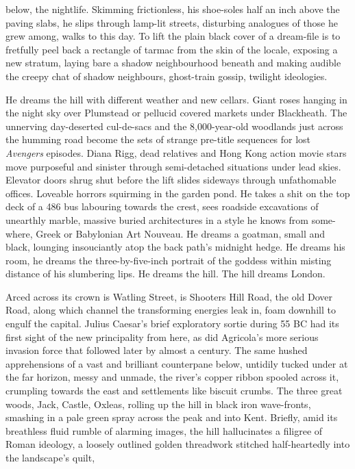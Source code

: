 \documentclass[
]{article}
\begin{document}
below, the nightlife. Skimming frictionless, his shoe-soles half an inch
above the paving slabs, he slips through lamp-lit streets, disturbing
analogues of those he grew among, walks to this day. To lift the plain
black cover of a dream-file is to fretfully peel back a rectangle of
tarmac from the skin of the locale, exposing a new stratum, laying bare
a shadow neighbourhood beneath and making audible the creepy chat of
shadow neighbours, ghost-train gossip, twilight ideologies. \par
He dreams the hill with different weather and new cellars. Giant
roses hanging in the night sky over Plumstead or pellucid covered
markets under Blackheath. The unnerving day-deserted cul-de-sacs and the
8,000-year-old woodlands just across the humming road become the sets of
strange pre-title sequences for lost \emph{Avengers} episodes. Diana
Rigg, dead relatives and Hong Kong action movie stars move purposeful
and sinister through semi-detached situations under lead skies. Elevator
doors shrug shut before the lift slides sideways through unfathomable
offices. Loveable horrors squirming in the garden pond. He takes a shit
on the top deck of a 486 bus labouring towards the crest, sees roadside
excavations of unearthly marble, massive buried architectures in a style
he knows from some-where, Greek or Babylonian Art Nouveau. He dreams a
goatman, small and black, lounging insouciantly atop the back path's
midnight hedge. He dreams his room, he dreams the three-by-five-inch
portrait of the goddess within misting distance of his slumbering lips.
He dreams the hill. The hill dreams London. \par
Arced across its crown is Watling Street, is Shooters Hill Road,
the old Dover Road, along which channel the transforming energies leak
in, foam downhill to engulf the capital. Julius Caesar's brief
exploratory sortie during 55 BC had its first sight of the new
principality from here, as did Agricola's more serious invasion force
that followed later by almost a century. The same hushed apprehensions
of a vast and brilliant counterpane below, untidily tucked under at the
far horizon, messy and unmade, the river's copper ribbon spooled across
it, crumpling towards the east and settlements like biscuit crumbs. The
three great woods, Jack, Castle, Oxleas, rolling up the hill in black
iron wave-fronts, smashing in a pale green spray across the peak and
into Kent. Briefly, amid its breathless fluid rumble of alarming images,
the hill hallucinates a filigree of Roman ideology, a loosely outlined
golden threadwork stitched half-heartedly into the landscape's quilt,
\end{document}

